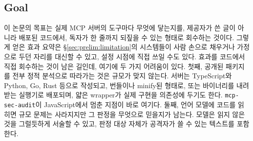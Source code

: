\documentclass[acmsmall,screen,review,anonymous]{acmart}
\begin{document}
\subsection{Goal}
\label{sec:prelim:goal}

이 논문의 목표는 실제 MCP 서버의 도구마다 무엇에 닿는지를, 제공자가 쓴 글이 아니라 배포된 코드에서, 독자가 한 줄까지 되짚을 수 있는 형태로 회수하는 것이다. 그렇게 얻은 효과 요약은 \S\ref{sec:prelim:limitation}의 시스템들이 사람 손으로 채우거나 가정으로 두던 자리를 대신할 수 있고, 설정 시점에 직접 쓰일 수도 있다. 효과를 코드에서 직접 회수하는 것이 남은 길인데, 여기에 두 가지 어려움이 있다. 첫째, 공개된 패키지를 전부 정적 분석으로 따라가는 것은 규모가 맞지 않는다. 서버는 TypeScript와 Python, Go, Rust 등으로 작성되고, 번들이나 minify된 형태로, 또는 바이너리를 내려받는 실행기로 배포되며, 얇은 wrapper가 실제 구현을 의존성에 두기도 한다. \texttt{mcp-sec-audit}이 JavaScript에서 멈춘 지점이 바로 여기다. 둘째, 언어 모델에 코드를 읽히면 규모 문제는 사라지지만 그 판정을 무엇으로 믿을지가 남는다. 모델은 읽지 않은 것을 그럴듯하게 서술할 수 있고, 판정 대상 자체가 공격자가 쓸 수 있는 텍스트를 포함한다.
\end{document}
